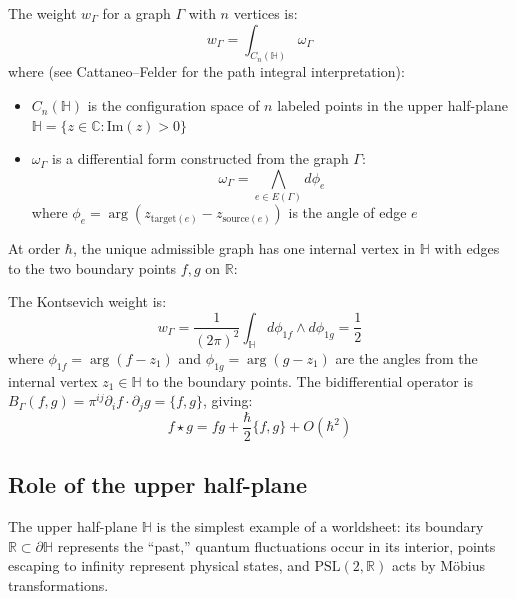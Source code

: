 The weight $w_\Gamma$ for a graph $\Gamma$ with $n$ vertices is:
\[w_\Gamma = \int_{C_n(\mathbb{H})} \omega_\Gamma\]
where (see Cattaneo--Felder \cite{CattaneoFelder99} for the path integral interpretation):
\begin{itemize}
\item $C_n(\mathbb{H})$ is the configuration space of $n$ labeled points in the upper half-plane $\mathbb{H} = \{z \in \mathbb{C} : \text{Im}(z) > 0\}$
\item $\omega_\Gamma$ is a differential form constructed from the graph $\Gamma$:
\[\omega_\Gamma = \bigwedge_{e \in E(\Gamma)} d\phi_e\]
where $\phi_e = \arg(z_{\text{target}(e)} - z_{\text{source}(e)})$ is the angle of edge $e$
\end{itemize}

\begin{example}
At order $\hbar$, the unique admissible graph has one internal vertex in $\mathbb{H}$ with edges to the two boundary points $f, g$ on $\mathbb{R}$:
\begin{center}
\end{center}

The Kontsevich weight is:
\[w_\Gamma = \frac{1}{(2\pi)^2}\int_{\mathbb{H}} d\phi_{1f} \wedge d\phi_{1g} = \frac{1}{2}\]
where $\phi_{1f} = \arg(f - z_1)$ and $\phi_{1g} = \arg(g - z_1)$ are the angles from the internal vertex $z_1 \in \mathbb{H}$ to the boundary points. The bidifferential operator is $B_\Gamma(f,g) = \pi^{ij}\partial_i f \cdot \partial_j g = \{f, g\}$, giving:
\[f \star g = fg + \frac{\hbar}{2}\{f,g\} + O(\hbar^2)\]
\end{example}

\subsection{Role of the upper half-plane}

The upper half-plane $\mathbb{H}$ is the simplest example of a worldsheet: its boundary $\mathbb{R} \subset \partial\mathbb{H}$ represents the ``past,'' quantum fluctuations occur in its interior, points escaping to infinity represent physical states, and $\text{PSL}(2,\mathbb{R})$ acts by M\"obius transformations.

